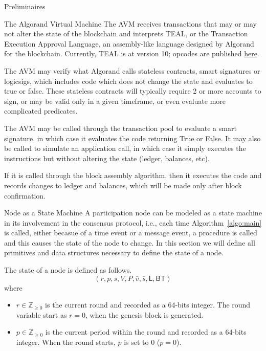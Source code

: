 \documentclass[10pt,a4paper]{article}
\begin{document}
\begin{section}{Preliminaires}
\begin{subsection}{The Algorand Virtual Machine}
The AVM receives transactions that may or may not alter the state of the blockchain 
and interprets TEAL, or the Transaction Execution 
Approval Language, an assembly-like language designed by Algorand 
for the blockchain. Currently, TEAL is at version 10; opcodes are
published \href{https://developer.algorand.org/docs/get-details/dapps/avm/teal/opcodes/}{here}. 

The AVM may verify what Algorand calls stateless contracts, smart signatures or 
logicsigs, which includes code which does not change the state and evaluates to 
true or false.
These stateless contracts will typically require 2 or more accounts to sign,
or may be valid only in a given timeframe, or even evaluate more complicated
predicates.

The AVM may be called through the transaction pool to evaluate a smart signature, in
which case it evaluates the code returning True or False.
It may also be called to simulate an application call, in which case it simply executes
the instructions but without altering the state (ledger, balances, etc).

If it is called through the block assembly algorithm, then it executes the code
and records changes to ledger and balances, which will be made only after block
confirmation.


\end{subsection}
\begin{subsection}{Node as a State Machine}\label{sect:state-machine}
A participation node can be modeled as a state machine in its involvement in the consensus 
protocol, i.e., each time Algorithm~\ref{algo:main} is called, either becasue of a time
event or a message event, a procedure is called and this causes the state of the node
to change.
In this section we will define all primitives and data structures necessary to define the state
of a node.

The {\sf state of a node} is defined as follows. 
$$
(r, p, s, V, P, \bar{v}, \bar{s}, \mathsf{L}, \mathsf{BT})
$$ 
where
\begin{itemize}
    \item 
    $r\in\mathbb{Z}_{\ge 0}$ is the current {\sf round} and recorded as a 64-bits integer. 
    The round variable start as $r=0$, when the genesis block is generated. 
    
    \item 
    $p\in\mathbb{Z}_{\ge 0}$ is the current {\sf period} within the round and recorded as 
    a 64-bits integer. When the round starts, $p$ is set to 0 ($p=0$).
    

\end{itemize}
\end{subsection}
\end{section}
\end{document}
